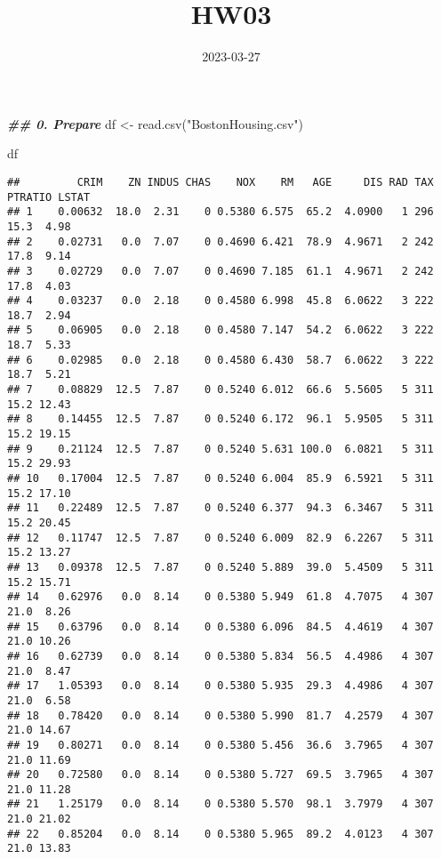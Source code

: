 \documentclass[
]{article}
\title{HW03}
\author{}
\date{\vspace{-2.5em}2023-03-27}
\newenvironment{Shaded}{\begin{snugshade}}{\end{snugshade}}
\newcommand{\DocumentationTok}[1]{\textcolor[rgb]{0.56,0.35,0.01}{\textbf{\textit{#1}}}}
\newcommand{\FunctionTok}[1]{\textcolor[rgb]{0.00,0.00,0.00}{#1}}
\newcommand{\NormalTok}[1]{#1}
\newcommand{\OtherTok}[1]{\textcolor[rgb]{0.56,0.35,0.01}{#1}}
\newcommand{\StringTok}[1]{\textcolor[rgb]{0.31,0.60,0.02}{#1}}
\begin{document}
\maketitle

\begin{Shaded}
\begin{Highlighting}[]
\DocumentationTok{\#\# 0. Prepare}
\NormalTok{df }\OtherTok{\textless{}{-}} \FunctionTok{read.csv}\NormalTok{(}\StringTok{"BostonHousing.csv"}\NormalTok{)}

\NormalTok{df}
\end{Highlighting}
\end{Shaded}

\begin{verbatim}
##         CRIM    ZN INDUS CHAS    NOX    RM   AGE     DIS RAD TAX PTRATIO LSTAT
## 1    0.00632  18.0  2.31    0 0.5380 6.575  65.2  4.0900   1 296    15.3  4.98
## 2    0.02731   0.0  7.07    0 0.4690 6.421  78.9  4.9671   2 242    17.8  9.14
## 3    0.02729   0.0  7.07    0 0.4690 7.185  61.1  4.9671   2 242    17.8  4.03
## 4    0.03237   0.0  2.18    0 0.4580 6.998  45.8  6.0622   3 222    18.7  2.94
## 5    0.06905   0.0  2.18    0 0.4580 7.147  54.2  6.0622   3 222    18.7  5.33
## 6    0.02985   0.0  2.18    0 0.4580 6.430  58.7  6.0622   3 222    18.7  5.21
## 7    0.08829  12.5  7.87    0 0.5240 6.012  66.6  5.5605   5 311    15.2 12.43
## 8    0.14455  12.5  7.87    0 0.5240 6.172  96.1  5.9505   5 311    15.2 19.15
## 9    0.21124  12.5  7.87    0 0.5240 5.631 100.0  6.0821   5 311    15.2 29.93
## 10   0.17004  12.5  7.87    0 0.5240 6.004  85.9  6.5921   5 311    15.2 17.10
## 11   0.22489  12.5  7.87    0 0.5240 6.377  94.3  6.3467   5 311    15.2 20.45
## 12   0.11747  12.5  7.87    0 0.5240 6.009  82.9  6.2267   5 311    15.2 13.27
## 13   0.09378  12.5  7.87    0 0.5240 5.889  39.0  5.4509   5 311    15.2 15.71
## 14   0.62976   0.0  8.14    0 0.5380 5.949  61.8  4.7075   4 307    21.0  8.26
## 15   0.63796   0.0  8.14    0 0.5380 6.096  84.5  4.4619   4 307    21.0 10.26
## 16   0.62739   0.0  8.14    0 0.5380 5.834  56.5  4.4986   4 307    21.0  8.47
## 17   1.05393   0.0  8.14    0 0.5380 5.935  29.3  4.4986   4 307    21.0  6.58
## 18   0.78420   0.0  8.14    0 0.5380 5.990  81.7  4.2579   4 307    21.0 14.67
## 19   0.80271   0.0  8.14    0 0.5380 5.456  36.6  3.7965   4 307    21.0 11.69
## 20   0.72580   0.0  8.14    0 0.5380 5.727  69.5  3.7965   4 307    21.0 11.28
## 21   1.25179   0.0  8.14    0 0.5380 5.570  98.1  3.7979   4 307    21.0 21.02
## 22   0.85204   0.0  8.14    0 0.5380 5.965  89.2  4.0123   4 307    21.0 13.83

\end{verbatim}
\end{document}
